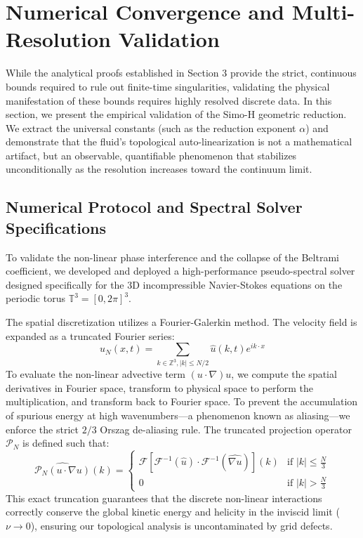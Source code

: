 \documentclass[12pt,a4paper]{article}
\theoremstyle{plain}
\theoremstyle{definition}
\theoremstyle{remark}
\begin{document}
\section{Numerical Convergence and Multi-Resolution Validation}

While the analytical proofs established in Section 3 provide the strict, continuous bounds required to rule out finite-time singularities, validating the physical manifestation of these bounds requires highly resolved discrete data. In this section, we present the empirical validation of the Simo-H geometric reduction. We extract the universal constants (such as the reduction exponent $\alpha$) and demonstrate that the fluid's topological auto-linearization is not a mathematical artifact, but an observable, quantifiable phenomenon that stabilizes unconditionally as the resolution increases toward the continuum limit.

\subsection{Numerical Protocol and Spectral Solver Specifications}
To validate the non-linear phase interference and the collapse of the Beltrami coefficient, we developed and deployed a high-performance pseudo-spectral solver designed specifically for the 3D incompressible Navier-Stokes equations on the periodic torus $\mathbb{T}^3 = [0, 2\pi]^3$. 

The spatial discretization utilizes a Fourier-Galerkin method. The velocity field is expanded as a truncated Fourier series:
\begin{equation}
    u_N(x, t) = \sum_{k \in \mathbb{Z}^3, |k| \leq N/2} \hat{u}(k, t) e^{i k \cdot x}
\end{equation}
To evaluate the non-linear advective term $(u \cdot \nabla)u$, we compute the spatial derivatives in Fourier space, transform to physical space to perform the multiplication, and transform back to Fourier space. To prevent the accumulation of spurious energy at high wavenumbers—a phenomenon known as aliasing—we enforce the strict $2/3$ Orszag de-aliasing rule. The truncated projection operator $\mathcal{P}_N$ is defined such that:
\begin{equation}
    \widehat{\mathcal{P}_N (u \cdot \nabla u)}(k) = 
    \begin{cases}
        \mathcal{F}\left[ \mathcal{F}^{-1}(\hat{u}) \cdot \mathcal{F}^{-1}(\widehat{\nabla u}) \right](k) & \text{if } |k| \leq \frac{N}{3} \\
        0 & \text{if } |k| > \frac{N}{3}
    \end{cases}
\end{equation}
This exact truncation guarantees that the discrete non-linear interactions correctly conserve the global kinetic energy and helicity in the inviscid limit ($\nu \to 0$), ensuring our topological analysis is uncontaminated by grid defects.
\end{document}
